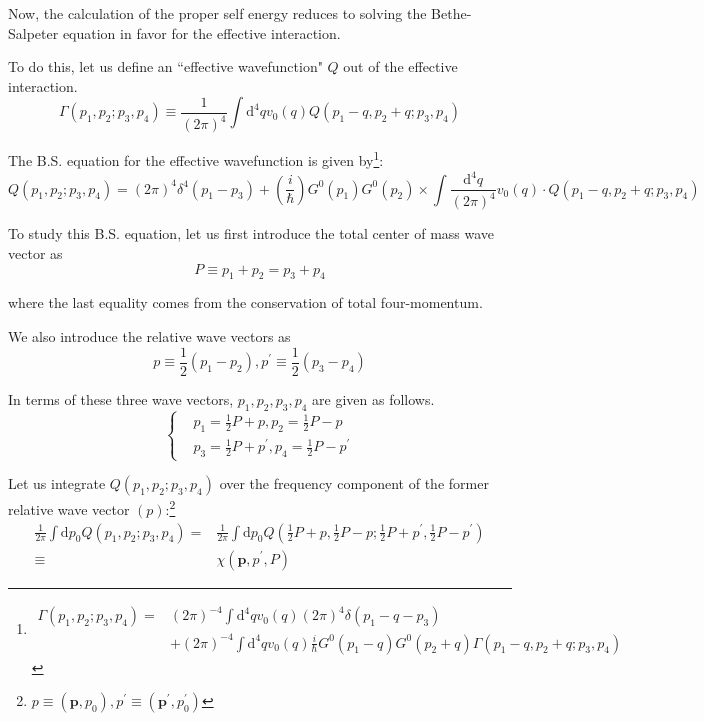 Now, the calculation of the proper self energy reduces to solving the Bethe-Salpeter equation in favor for the effective interaction.

To do this, let us define an ``effective wavefunction" $Q$ out of the effective interaction.
\begin{equation} \label{Eqs2.7.7}
\Gamma(p_1,p_2;p_3,p_4) \equiv \frac{1}{(2\pi)^4} \int \mathrm{d}^4 q v_0(q) Q(p_1-q,p_2+q;p_3,p_4)
\end{equation}

The B.S. equation for the effective wavefunction is given by\footnote{\[ \begin{split} \Gamma(p_1,p_2;p_3,p_4) =& (2\pi)^{-4} \int \mathrm{d}^4 q v_0(q) (2\pi)^4 \delta(p_1-q-p_3) \\&+ (2\pi)^{-4} \int \mathrm{d}^4 q v_0(q) \frac{i}{\hbar}G^0(p_1-q)G^0(p_2+q)\Gamma(p_1-q,p_2+q;p_3,p_4) \end{split} \]}:
\begin{equation} \label{Eqs2.7.8}
Q(p_1,p_2;p_3,p_4) = (2\pi)^4 \delta^4(p_1-p_3) + \left(\frac{i}{\hbar}\right) G^0(p_1)G^0(p_2) \times \int \frac{\mathrm{d}^4 q}{(2\pi)^4} v_0(q)\cdot Q(p_1-q,p_2+q;p_3,p_4)
\end{equation}

To study this B.S. equation, let us first introduce the total center of mass wave vector as
\begin{equation} \label{Eqs2.7.9} P \equiv p_1+p_2 = p_3 + p_4 \end{equation}

where the last equality comes from the conservation of total four-momentum.

We also introduce the relative wave vectors as
\begin{equation} \label{Eqs2.7.10} p \equiv \frac{1}{2}(p_1-p_2), p^{'} \equiv \frac{1}{2}(p_3-p_4) \end{equation}

In terms of these three wave vectors, $p_1,p_2,p_3,p_4$ are given as follows.
\begin{equation} \label{Eqs2.7.11} \left \{ \begin{split} &p_1 = \frac{1}{2}P+p, p_2 = \frac{1}{2}P-p \\ &p_3 = \frac{1}{2}P+p^{'} , p_4 = \frac{1}{2}P-p^{'}
\end{split} \right. \end{equation}

Let us integrate $Q(p_1,p_2;p_3,p_4)$ over the frequency component of the former relative wave vector $(p)$:\footnote{$p \equiv (\mathbf{p},p_0), p^{'} \equiv (\mathbf{p}^{'},p_0^{'})$}
\begin{equation} \label{2.7.12} \begin{split}
\frac{1}{2\pi} \int \mathrm{d}p_0 Q(p_1,p_2;p_3,p_4) =
& \frac{1}{2\pi} \int \mathrm{d}p_0 Q(\frac{1}{2}P+p,\frac{1}{2}P-p;\frac{1}{2}P+p^{'},\frac{1}{2}P-p^{'})\\
\equiv & \chi(\mathbf{p},p^{'},P)
\end{split}\end{equation}

